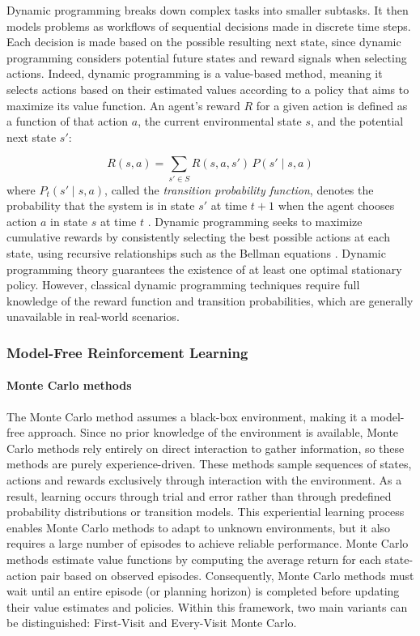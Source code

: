 \documentclass[12pt,a4paper]{report}
\begin{document}
Dynamic programming breaks down complex tasks into smaller subtasks. It then models 
problems as workflows of sequential decisions made in discrete time steps. Each decision is made based on the possible resulting next state, since dynamic programming considers potential future states and reward signals when selecting actions. Indeed, 
dynamic programming is a value-based method, meaning it selects actions based on their 
estimated values according to a policy that aims to maximize its value function.
An agent's reward $R$ for a given action is defined as a function of that action $a$, 
the current environmental state $s$, and the potential next state $s'$:

\[
    R(s, a) = \sum_{s' \in S} R(s, a, s') \, P(s' \mid s, a)
\]
where $P_t(s' \mid s, a)$, called the \textit{transition probability function}, denotes 
the probability that the system is in state $s'$ at time $t+1$ when the agent chooses 
action $a$ in state $s$ at time $t$ \cite{chiave45}.
Dynamic programming seeks to maximize cumulative rewards by consistently selecting the 
best possible actions at each state, using recursive relationships such as the Bellman 
equations \cite{chiave7}. Dynamic programming theory guarantees the existence 
of at least one optimal stationary policy. However, classical dynamic programming 
techniques require full knowledge of the reward function and transition probabilities, 
which are generally unavailable in real-world scenarios.

\subsubsection{Model-Free Reinforcement Learning}

\paragraph{Monte Carlo methods}
The Monte Carlo method assumes a black-box environment, making it a model-free approach. Since no prior knowledge of the environment is available, Monte Carlo methods rely entirely on direct interaction to gather information, so these methods are purely experience-driven. These methods sample sequences of states, actions and rewards exclusively through interaction with the environment. As a result, learning occurs through trial and error \cite{chiave44} rather than through predefined probability distributions or transition models. This experiential learning process enables Monte Carlo methods to adapt to unknown environments, but it also requires a large number of episodes to achieve reliable performance.
Monte Carlo methods estimate value functions by computing the average return for each state-action pair based on observed episodes. Consequently, Monte Carlo methods must wait until an entire episode (or planning horizon) is completed before updating their value estimates and policies.
Within this framework, two main variants can be distinguished: First-Visit and 
Every-Visit Monte Carlo.
\end{document}
